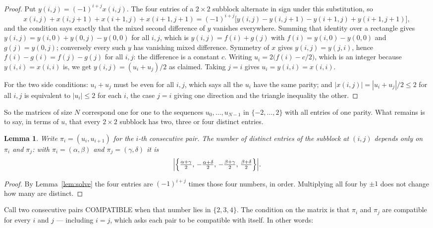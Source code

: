 \documentclass[11pt,a4paper]{article}
\theoremstyle{plain}
\newtheorem{lemma}[theorem]{Lemma}
\theoremstyle{definition}
\begin{document}
\begin{proof}
Put $y(i,j)=(-1)^{i+j}x(i,j)$. The four entries of a $2\times2$ subblock alternate in sign
under this substitution, so
\[
x(i,j)+x(i,j{+}1)+x(i{+}1,j)+x(i{+}1,j{+}1)
=(-1)^{i+j}\bigl[y(i,j)-y(i,j{+}1)-y(i{+}1,j)+y(i{+}1,j{+}1)\bigr],
\]
and the condition says exactly that the mixed second difference of $y$ vanishes everywhere.
Summing that identity over a rectangle gives
$y(i,j)=y(i,0)+y(0,j)-y(0,0)$ for all $i,j$, which is $y(i,j)=f(i)+g(j)$ with
$f(i)=y(i,0)-y(0,0)$ and $g(j)=y(0,j)$; conversely every such $y$ has vanishing mixed
difference. Symmetry of $x$ gives $y(i,j)=y(j,i)$, hence $f(i)-g(i)=f(j)-g(j)$ for all $i,j$:
the difference is a constant $c$. Writing $u_i=2\bigl(f(i)-c/2\bigr)$, which is an integer
because $y(i,i)=x(i,i)$ is, we get $y(i,j)=(u_i+u_j)/2$ as claimed. Taking $j=i$ gives
$u_i=y(i,i)=x(i,i)$.

For the two side conditions: $u_i+u_j$ must be even for all $i,j$, which says all the $u_i$ have
the same parity; and $|x(i,j)|=|u_i+u_j|/2\le2$ for all $i,j$ is equivalent to $|u_i|\le2$
for each $i$, the case $j=i$ giving one direction and the triangle inequality the other.
\end{proof}

So the matrices of size $N$ correspond one for one to the sequences $u_0,\dots,u_{N-1}$ in
$\{-2,\dots,2\}$ with all entries of one parity. What remains is to say, in terms of $u$,
that every $2\times2$ subblock has two, three or four distinct entries.

\begin{lemma}\label{lem:block}
Write $\pi_i=(u_i,u_{i+1})$ for the $i$-th consecutive pair. The number of distinct entries of
the subblock at $(i,j)$ depends only on $\pi_i$ and $\pi_j$: with $\pi_i=(\alpha,\beta)$ and
$\pi_j=(\gamma,\delta)$ it is
\[
\Bigl|\Bigl\{\tfrac{\alpha+\gamma}{2},\,-\tfrac{\alpha+\delta}{2},\,
-\tfrac{\beta+\gamma}{2},\,\tfrac{\beta+\delta}{2}\Bigr\}\Bigr| .
\]
\end{lemma}

\begin{proof}
By Lemma~\ref{lem:solve} the four entries are $(-1)^{i+j}$ times those four numbers, in
order. Multiplying all four by $\pm1$ does not change how many are distinct.
\end{proof}

Call two consecutive pairs COMPATIBLE when that number lies in $\{2,3,4\}$. The condition on the
matrix is that $\pi_i$ and $\pi_j$ are compatible for every $i$ and $j$ --- including $i=j$,
which asks each pair to be compatible with itself. In other words:
\end{document}
